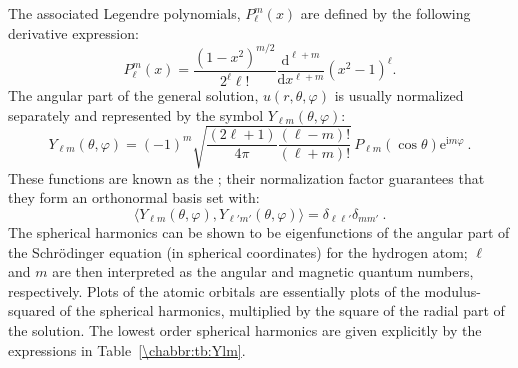 The associated Legendre polynomials, $P_{\ell}^{m}(x)$ are defined by the following derivative expression:
\begin{equation}
	P_{\ell}^{m}(x) = \frac{(1-x^2)^{m/2}}{2^{\ell}\ell!}\frac{\mathrm{d}^{\ell+m}}{\mathrm{d}x^{\ell+m}}(x^2-1)^{\ell}.
\end{equation}
The angular part of the general solution, $u(r,\theta,\varphi)$ is usually normalized separately and represented by the symbol $Y_{\ell m}(\theta,\varphi)$:
\begin{equation}
	Y_{\ell m}(\theta,\varphi) = (-1)^m\sqrt{\frac{(2\ell+1)}{4\pi}\frac{(\ell-m)!}{(\ell+m)!}}\, P_{\ell m}(\cos\theta)\mathrm{e}^{\mathrm{i}m\varphi}\ .\label{\chabbr:eq:Ylm}
\end{equation}
These functions are known as the ; their normalization factor guarantees that they form an orthonormal basis set with:
\[
	\langle Y_{\ell m}(\theta,\varphi) ,Y_{\ell' m'}(\theta,\varphi) \rangle = \delta_{\ell\ell'}\delta_{mm'}\ .
\]
The spherical harmonics can be shown to be eigenfunctions of the angular part of the Schr\"odinger equation (in spherical coordinates) for the hydrogen atom; $\ell$ and $m$ are then interpreted as the angular and magnetic quantum numbers, respectively. Plots of the atomic orbitals are essentially plots of the modulus-squared of the spherical harmonics, multiplied by the square of the radial part of the solution.  The lowest order spherical harmonics are given explicitly by the expressions in Table~\ref{\chabbr:tb:Ylm}.

